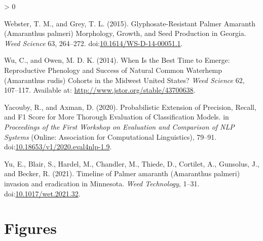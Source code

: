 \documentclass[utf8]{frontiersSCNS}
\newlength{\cslhangindent}
\newenvironment{CSLReferences}[2] %
 {%
  \setlength{\parindent}{0pt}
  \ifodd #1 \everypar{\setlength{\hangindent}{\cslhangindent}}\ignorespaces\fi
  \ifnum #2 > 0
  \setlength{\parskip}{#2\baselineskip}
  \fi
 }%
 {}
\begin{document}
\begin{CSLReferences}{1}{0}
\leavevmode\hypertarget{ref-webster2015}{}%
Webster, T. M., and Grey, T. L. (2015). Glyphosate-{Resistant Palmer
Amaranth} ({Amaranthus} palmeri) {Morphology}, {Growth}, and {Seed
Production} in {Georgia}. \emph{Weed Science} 63, 264--272.
doi:\href{https://doi.org/10.1614/WS-D-14-00051.1}{10.1614/WS-D-14-00051.1}.

\leavevmode\hypertarget{ref-wu2014}{}%
Wu, C., and Owen, M. D. K. (2014). When {Is} the {Best Time} to
{Emerge}: {Reproductive Phenology} and {Success} of {Natural Common
Waterhemp} ({Amaranthus} rudis) {Cohorts} in the {Midwest United
States}? \emph{Weed Science} 62, 107--117. Available at:
\url{http://www.jstor.org/stable/43700638}.

\leavevmode\hypertarget{ref-yacouby2020}{}%
Yacouby, R., and Axman, D. (2020). Probabilistic {Extension} of
{Precision}, {Recall}, and {F1 Score} for {More Thorough Evaluation} of
{Classification Models}. in \emph{Proceedings of the {First Workshop} on
{Evaluation} and {Comparison} of {NLP Systems}} ({Online}: {Association
for Computational Linguistics}), 79--91.
doi:\href{https://doi.org/10.18653/v1/2020.eval4nlp-1.9}{10.18653/v1/2020.eval4nlp-1.9}.

\leavevmode\hypertarget{ref-yu2021}{}%
Yu, E., Blair, S., Hardel, M., Chandler, M., Thiede, D., Cortilet, A.,
Gunsolus, J., and Becker, R. (2021). Timeline of {Palmer} amaranth
({Amaranthus} palmeri) invasion and eradication in {Minnesota}.
\emph{Weed Technology}, 1--31.
doi:\href{https://doi.org/10.1017/wet.2021.32}{10.1017/wet.2021.32}.

\end{CSLReferences}

\hypertarget{figures}{%
\section*{Figures}\label{figures}}
\end{document}
